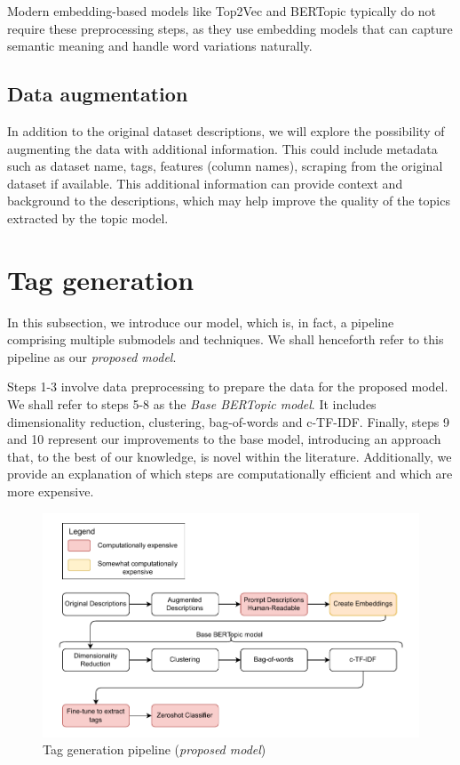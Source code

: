 Modern embedding-based models like Top2Vec and BERTopic typically do not require these preprocessing steps, as they use embedding models that can capture semantic meaning and handle word variations naturally.

\subsection{Data augmentation}
In addition to the original dataset descriptions, we will explore the possibility of augmenting the data with additional information. This could include metadata such as dataset name, tags, features (column names), scraping from the original dataset if available. This additional information can provide context and background to the descriptions, which may help improve the quality of the topics extracted by the topic model.

\section{Tag generation}
\label{sec:tag_generation}
In this subsection, we introduce our model, which is, in fact, a pipeline comprising multiple submodels and techniques. We shall henceforth refer to this pipeline as our \textit{proposed model}.

Steps 1-3 involve data preprocessing to prepare the data for the proposed model. We shall refer to steps 5-8 as the \textit{Base BERTopic model}. It includes dimensionality reduction, clustering, bag-of-words and c-TF-IDF. Finally, steps 9 and 10 represent our improvements to the base model, introducing an approach that, to the best of our knowledge, is novel within the literature. Additionally, we provide an explanation of which steps are computationally efficient and which are more expensive.

\begin{figure}[h]
    \centering
    \includegraphics[width=\textwidth]{figures/tag_generation_pipeline.pdf}
    \caption{Tag generation pipeline (\textit{proposed model})}
    \label{fig:tag_generation_pipeline}
\end{figure}

